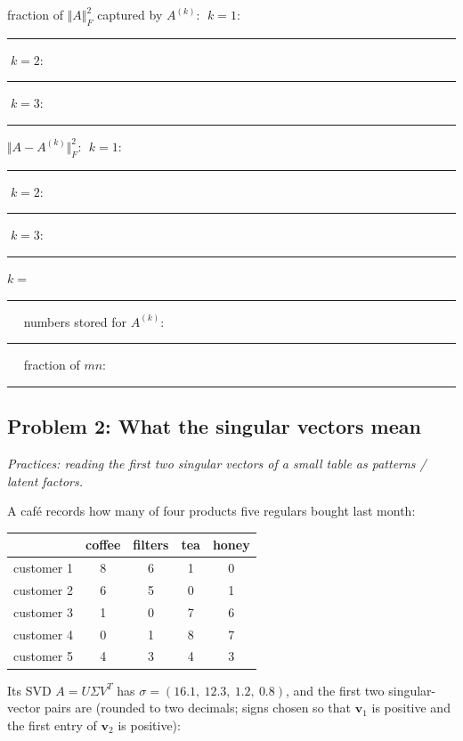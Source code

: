 \documentclass[
  11pt,
]{article}
\newcounter{none} %
\newcommand{\answerspace}[1]{\par\vspace*{#1}}  %
\newcommand{\blank}[1][1.2in]{\rule{#1}{0.4pt}}
\newcommand{\answerpage}{\clearpage}
\begin{document}
fraction of \(\Vert A\Vert_F^2\) captured by \(A^{(k)}\): \(\;k{=}1\):
\blank[0.8in] \(\;k{=}2\): \blank[0.8in] \(\;k{=}3\): \blank[0.8in]

\(\Vert A - A^{(k)}\Vert_F^2\): \(\;k{=}1\): \blank[0.8in] \(\;k{=}2\):
\blank[0.8in] \(\;k{=}3\): \blank[0.8in]

\(k =\) \blank[0.6in] \(\quad\) numbers stored for \(A^{(k)}\):
\blank[0.9in] \(\quad\) fraction of \(mn\): \blank[0.9in]

\answerspace{0.3in}

\answerpage

\subsection{Problem 2: What the singular vectors
mean}\label{problem-2-what-the-singular-vectors-mean}

\emph{Practices: reading the first two singular vectors of a small table
as patterns / latent factors.}

A café records how many of four products five regulars bought last
month:

{\def\LTcaptype{none} %
\begin{longtable}[]{@{}lcccc@{}}
\toprule\noalign{}
& coffee & filters & tea & honey \\
\midrule\noalign{}
\endhead
\bottomrule\noalign{}
\endlastfoot
customer 1 & 8 & 6 & 1 & 0 \\
customer 2 & 6 & 5 & 0 & 1 \\
customer 3 & 1 & 0 & 7 & 6 \\
customer 4 & 0 & 1 & 8 & 7 \\
customer 5 & 4 & 3 & 4 & 3 \\
\end{longtable}
}

Its SVD \(A = U\Sigma V^T\) has \(\sigma = (16.1,\ 12.3,\ 1.2,\ 0.8)\),
and the first two singular-vector pairs are (rounded to two decimals;
signs chosen so that \(\mathbf v_1\) is positive and the first entry of
\(\mathbf v_2\) is positive):
\end{document}

